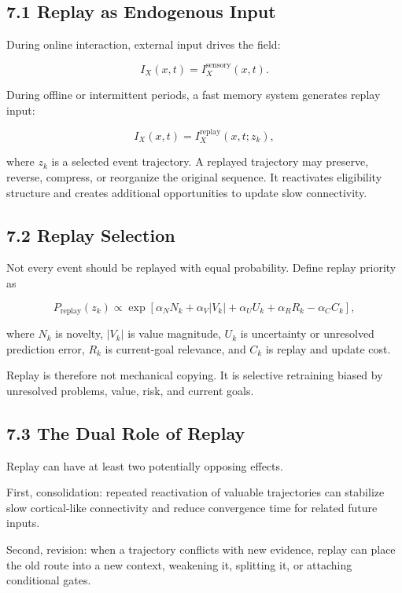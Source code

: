 \documentclass[11pt, a4paper]{article}
\begin{document}
\subsection{7.1 Replay as Endogenous Input}

During online interaction, external input drives the field:

\[
I_X(x,t)=I_X^{\mathrm{sensory}}(x,t).
\]

During offline or intermittent periods, a fast memory system generates replay input:

\[
I_X(x,t)=I_X^{\mathrm{replay}}(x,t;z_k),
\]

where $z_k$ is a selected event trajectory. A replayed trajectory may preserve, reverse, compress, or reorganize the original sequence. It reactivates eligibility structure and creates additional opportunities to update slow connectivity.

\subsection{7.2 Replay Selection}

Not every event should be replayed with equal probability. Define replay priority as

\[
P_{\mathrm{replay}}(z_k)\propto
\exp\left[
\alpha_NN_k+\alpha_V|V_k|+\alpha_UU_k+\alpha_RR_k-\alpha_CC_k
\right],
\]

where $N_k$ is novelty, $|V_k|$ is value magnitude, $U_k$ is uncertainty or unresolved prediction error, $R_k$ is current-goal relevance, and $C_k$ is replay and update cost.

Replay is therefore not mechanical copying. It is selective retraining biased by unresolved problems, value, risk, and current goals.

\subsection{7.3 The Dual Role of Replay}

Replay can have at least two potentially opposing effects.

First, consolidation: repeated reactivation of valuable trajectories can stabilize slow cortical-like connectivity and reduce convergence time for related future inputs.

Second, revision: when a trajectory conflicts with new evidence, replay can place the old route into a new context, weakening it, splitting it, or attaching conditional gates.
\end{document}
